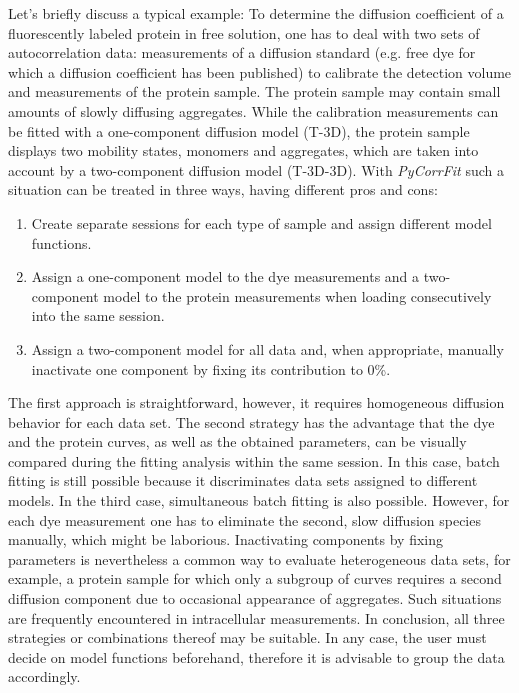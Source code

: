 Let's briefly discuss a typical example: To determine the diffusion coefficient of a fluorescently labeled protein in free solution, one has to deal with two sets of autocorrelation data: measurements of a diffusion standard (e.g. free dye for which a diffusion coefficient has been published) to calibrate the detection volume and measurements of the protein sample. The protein sample may contain small amounts of slowly diffusing aggregates. While the calibration measurements can be fitted with a one-component diffusion model (T-3D), the protein sample displays two mobility states, monomers and aggregates, which are taken into account by a two-component diffusion model (T-3D-3D). With \textit{PyCorrFit} such a situation can be treated in three ways, having different pros and cons: 


\begin{enumerate}
\item Create separate sessions for each type of sample and assign different model functions.
\item Assign a one-component model to the dye measurements and a two-component model to the protein measurements when loading consecutively into the same session.
\item Assign a two-component model for all data and, when appropriate, manually inactivate one component by fixing its contribution to 0\%.
\end{enumerate}


The first approach is straightforward, however, it requires homogeneous diffusion behavior for each data set. The second strategy has the advantage that the dye and the protein curves, as well as the obtained parameters, can be visually compared during the fitting analysis within the same session. In this case, batch fitting is still possible because it discriminates data sets assigned to different models. In the third case, simultaneous batch fitting is also possible. However, for each dye measurement one has to eliminate the second, slow diffusion species manually, which might be laborious. Inactivating components by fixing parameters is nevertheless a common way to evaluate heterogeneous data sets, for example, a protein sample for which only a subgroup of curves requires a second diffusion component due to occasional appearance of aggregates. Such situations are frequently encountered in intracellular measurements. In conclusion, all three strategies or combinations thereof may be suitable. In any case, the user must decide on model functions beforehand, therefore it is advisable to group the data accordingly.

